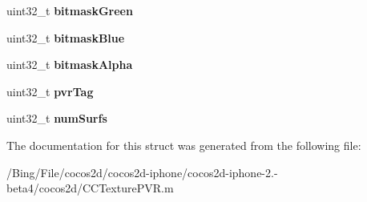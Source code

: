 \begin{DoxyCompactItemize}
\item 
\hypertarget{struct___p_v_r_tex_header_a05d83959b74bf8a8eecc3c5321973459}{uint32\-\_\-t {\bfseries bitmask\-Green}}\label{struct___p_v_r_tex_header_a05d83959b74bf8a8eecc3c5321973459}

\item 
\hypertarget{struct___p_v_r_tex_header_a1b6bbf2a0bde98a4a9e3cf98bf02c0ce}{uint32\-\_\-t {\bfseries bitmask\-Blue}}\label{struct___p_v_r_tex_header_a1b6bbf2a0bde98a4a9e3cf98bf02c0ce}

\item 
\hypertarget{struct___p_v_r_tex_header_a51f3bbd1d5a83b7c9d02649715785361}{uint32\-\_\-t {\bfseries bitmask\-Alpha}}\label{struct___p_v_r_tex_header_a51f3bbd1d5a83b7c9d02649715785361}

\item 
\hypertarget{struct___p_v_r_tex_header_a9bb7e0ba588d1efc77247d488fa96d5c}{uint32\-\_\-t {\bfseries pvr\-Tag}}\label{struct___p_v_r_tex_header_a9bb7e0ba588d1efc77247d488fa96d5c}

\item 
\hypertarget{struct___p_v_r_tex_header_a7c26cd344bcae16ec3e14255df690f83}{uint32\-\_\-t {\bfseries num\-Surfs}}\label{struct___p_v_r_tex_header_a7c26cd344bcae16ec3e14255df690f83}

\end{DoxyCompactItemize}


The documentation for this struct was generated from the following file\-:\begin{DoxyCompactItemize}
\item 
/\-Bing/\-File/cocos2d/cocos2d-\/iphone/cocos2d-\/iphone-\/2.-\/beta4/cocos2d/C\-C\-Texture\-P\-V\-R.\-m\end{DoxyCompactItemize}

